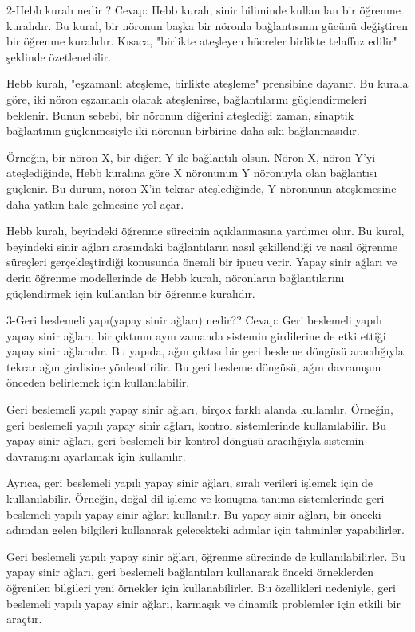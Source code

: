 \documentclass[11pt]{article}
\begin{document}
2-Hebb kuralı nedir ?\newline
Cevap: Hebb kuralı, sinir biliminde kullanılan bir öğrenme kuralıdır. Bu kural, bir nöronun başka bir nöronla bağlantısının gücünü değiştiren bir öğrenme kuralıdır. Kısaca, "birlikte ateşleyen hücreler birlikte telaffuz edilir" şeklinde özetlenebilir.

Hebb kuralı, "eşzamanlı ateşleme, birlikte ateşleme" prensibine dayanır. Bu kurala göre, iki nöron eşzamanlı olarak ateşlenirse, bağlantılarını güçlendirmeleri beklenir. Bunun sebebi, bir nöronun diğerini ateşlediği zaman, sinaptik bağlantının güçlenmesiyle iki nöronun birbirine daha sıkı bağlanmasıdır.

Örneğin, bir nöron X, bir diğeri Y ile bağlantılı olsun. Nöron X, nöron Y'yi ateşlediğinde, Hebb kuralına göre X nöronunun Y nöronuyla olan bağlantısı güçlenir. Bu durum, nöron X'in tekrar ateşlediğinde, Y nöronunun ateşlemesine daha yatkın hale gelmesine yol açar.

Hebb kuralı, beyindeki öğrenme sürecinin açıklanmasına yardımcı olur. Bu kural, beyindeki sinir ağları arasındaki bağlantıların nasıl şekillendiği ve nasıl öğrenme süreçleri gerçekleştirdiği konusunda önemli bir ipucu verir. Yapay sinir ağları ve derin öğrenme modellerinde de Hebb kuralı, nöronların bağlantılarını güçlendirmek için kullanılan bir öğrenme kuralıdır.

3-Geri beslemeli yapı(yapay sinir ağları) nedir??\newline
Cevap: Geri beslemeli yapılı yapay sinir ağları, bir çıktının aynı zamanda sistemin girdilerine de etki ettiği yapay sinir ağlarıdır. Bu yapıda, ağın çıktısı bir geri besleme döngüsü aracılığıyla tekrar ağın girdisine yönlendirilir. Bu geri besleme döngüsü, ağın davranışını önceden belirlemek için kullanılabilir.

Geri beslemeli yapılı yapay sinir ağları, birçok farklı alanda kullanılır. Örneğin, geri beslemeli yapılı yapay sinir ağları, kontrol sistemlerinde kullanılabilir. Bu yapay sinir ağları, geri beslemeli bir kontrol döngüsü aracılığıyla sistemin davranışını ayarlamak için kullanılır.

Ayrıca, geri beslemeli yapılı yapay sinir ağları, sıralı verileri işlemek için de kullanılabilir. Örneğin, doğal dil işleme ve konuşma tanıma sistemlerinde geri beslemeli yapılı yapay sinir ağları kullanılır. Bu yapay sinir ağları, bir önceki adımdan gelen bilgileri kullanarak gelecekteki adımlar için tahminler yapabilirler.

Geri beslemeli yapılı yapay sinir ağları, öğrenme sürecinde de kullanılabilirler. Bu yapay sinir ağları, geri beslemeli bağlantıları kullanarak önceki örneklerden öğrenilen bilgileri yeni örnekler için kullanabilirler. Bu özellikleri nedeniyle, geri beslemeli yapılı yapay sinir ağları, karmaşık ve dinamik problemler için etkili bir araçtır.
\end{document}
